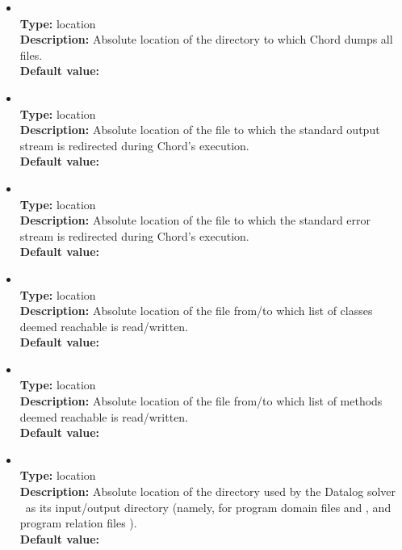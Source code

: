 \begin{itemize}
\item
{} \\
{\bf Type:} location \\
{\bf Description:} Absolute location of the directory to which Chord dumps all files. \\
{\bf Default value:}  

\item
{} \\
{\bf Type:} location \\
{\bf Description:} Absolute location of the file to which the standard output stream is redirected during Chord's execution. \\
{\bf Default value:} 

\item
{} \\
{\bf Type:} location \\
{\bf Description:} Absolute location of the file to which the standard error stream is redirected during Chord's execution. \\
{\bf Default value:} 

\item
{} \\
{\bf Type:} location \\
{\bf Description:} Absolute location of the file from/to which list of classes deemed reachable is read/written. \\
{\bf Default value:} 

\item
{} \\
{\bf Type:} location \\
{\bf Description:} Absolute location of the file from/to which list of methods deemed reachable is read/written. \\
{\bf Default value:} 

\item
{} \\
{\bf Type:} location \\
{\bf Description:} Absolute location of the directory used by the Datalog solver \bddbddb\ as its input/output directory (namely, for program domain files  and , and program relation files ). \\
{\bf Default value:} 


\end{itemize}
